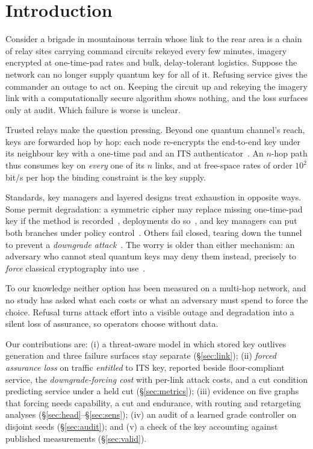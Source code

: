 \documentclass[conference,a4paper]{IEEEtran}
\begin{document}
\section{Introduction}
Consider a brigade in mountainous terrain whose link to the rear area is a chain of
relay sites carrying command circuits rekeyed every few minutes, imagery encrypted at
one-time-pad rates and bulk, delay-tolerant logistics. Suppose the network can no
longer supply quantum key for all of it. Refusing service gives the commander an
outage to act on. Keeping the circuit up and rekeying the imagery link with a
computationally secure algorithm shows nothing, and the loss surfaces only at audit.
Which failure is worse is unclear.

Trusted relays make the question pressing. Beyond one quantum channel's reach, keys
are forwarded hop by hop: each node re-encrypts the end-to-end key under its neighbour
key with a one-time pad and an ITS authenticator~\cite{salvail}. An $n$-hop path thus
consumes key on \emph{every} one of its $n$ links, and at free-space rates of order $10^{2}$\,bit/s per hop the binding constraint is the key supply.

Standards, key managers and layered designs treat exhaustion in opposite ways. Some
permit degradation: a symmetric cipher may replace missing one-time-pad key if the
method is recorded~\cite{itu3803}, deployments do so~\cite{makris}, and key managers
can put both branches under policy control~\cite{tysowski}. Others fail closed,
tearing down the tunnel to prevent a \emph{downgrade attack}~\cite{spooren}. The worry
is older than either mechanism: an adversary who cannot steal quantum keys may deny
them instead, precisely to \emph{force} classical cryptography into
use~\cite{schartner}.

To our knowledge neither option has been measured on a multi-hop network, and no study
has asked what each costs or what an adversary must spend to force the choice.
Refusal turns attack effort into a visible outage and degradation into a silent loss of assurance, so operators choose without data.

Our contributions are: (i) a threat-aware model in which stored key outlives
generation and three failure surfaces stay separate (\S\ref{sec:link}); (ii)
\emph{forced assurance loss} on traffic \emph{entitled} to ITS key, reported beside
floor-compliant service, the \emph{downgrade-forcing cost} with per-link attack costs,
and a cut condition predicting service under a held cut (\S\ref{sec:metrics}); (iii)
evidence on five graphs that forcing needs capability, a cut and endurance, with
routing and retargeting analyses (\S\ref{sec:head}--\S\ref{sec:sens}); (iv) an audit
of a learned grade controller on disjoint seeds (\S\ref{sec:audit}); and (v) a check of
the key accounting against published measurements (\S\ref{sec:valid}).
\end{document}
